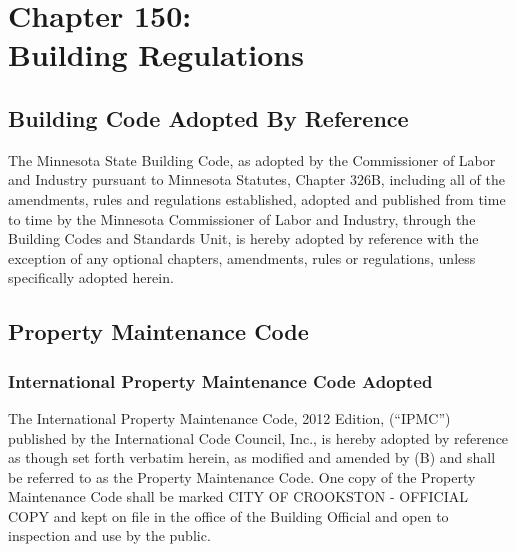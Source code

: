 \chapter*{Chapter 150: \\
	Building Regulations}
    \vfill
    \minitoc
    \pagebreak

\section{Building Code Adopted By Reference}
The Minnesota State Building Code, as adopted by the Commissioner of Labor and Industry pursuant to Minnesota Statutes, Chapter 326B, including all of the amendments, rules and regulations established, adopted and published from time to time by the Minnesota Commissioner of Labor and Industry, through the Building Codes and Standards Unit, is hereby adopted by reference with the exception of any optional chapters, amendments, rules or regulations, unless specifically adopted herein. 

\section{Property Maintenance Code}
\subsection{International Property Maintenance Code Adopted}
The International Property Maintenance Code, 2012 Edition, (“IPMC”) published by the International Code Council, Inc., is hereby adopted by reference as though set forth verbatim herein, as modified and amended by (B) and shall be referred to as the Property Maintenance Code. One copy of the Property Maintenance Code shall be marked CITY OF CROOKSTON - OFFICIAL COPY and kept on file in the office of the Building Official and open to inspection and use by the public.  
